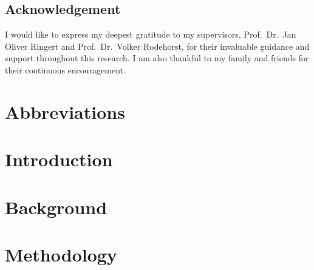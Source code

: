 \begin{frontmatter}
       
    \chapter*{Acknowledgement}
    I would like to express my deepest gratitude to my supervisors, Prof.\ Dr.\ Jan Oliver Ringert and Prof.\ Dr.\ Volker Rodehorst, for their invaluable guidance and support throughout this research. I am also thankful to my family and friends for their continuous encouragement.
    
    \tableofcontents
    \listoffigures
    \listoftables
    
    
    
\end{frontmatter}

% 


\chapter*{Abbreviations}



\printnomenclature

\chapter{Introduction} \label{Introduction}


\chapter{Background} \label{Background}


\chapter{Methodology} \label{Methodology}


